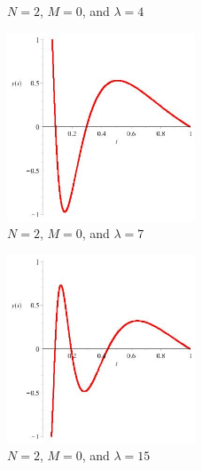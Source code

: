 \documentclass[executivepaper]{article}
\begin{document}
\begin{center}
\begin{figure}[!ht]
\caption{$N=2$, $M=0$, and $\lambda=4$}

\end{figure}

\vspace{5mm}

\begin{figure}[!ht]

\centering

\includegraphics[width=0.5\textwidth]{NEquals2MEquals0LambdaEquals7}

\caption{$N=2$, $M=0$, and $\lambda=7$}

\end{figure}

\vspace{5mm}

\begin{figure}[!ht]

\centering

\includegraphics[width=0.5\textwidth]{NEquals2MEquals0LambdaEquals15}

\caption{$N=2$, $M=0$, and $\lambda=15$}

\end{figure}

\vspace{5mm}


\end{center}
\end{document}
